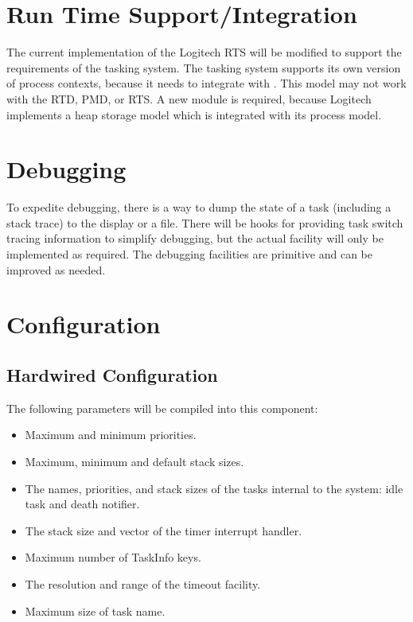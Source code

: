 \section{Run Time Support/Integration}

The current implementation of the Logitech RTS will be
modified to support the requirements of the tasking system.  
The tasking system supports its own version of process contexts,
because it needs to integrate with .
This model may not work with the RTD, PMD, or RTS.  A 
new  module is required, because Logitech implements
a heap storage model which is integrated with its process model.

\section{Debugging}

To expedite debugging, there is a way to dump the state
of a task (including a stack trace) to the display or a file.  
There will be hooks for providing task switch tracing information to
simplify debugging, but the actual facility will only be implemented
as required.  The debugging facilities are primitive and can be improved
as needed.

\section{Configuration}

\subsection{Hardwired Configuration}
The following parameters will be compiled into this component:
\begin{itemize}
\item
    Maximum and minimum priorities.
\item
    Maximum, minimum and default stack sizes.
\item
    The names, priorities, and stack sizes of the tasks internal to the system: 
    idle task and death notifier.
\item
    The stack size and vector of the timer interrupt handler.
\item
    Maximum number of TaskInfo keys.
\item
    The resolution and range of the timeout facility.
\item
    Maximum size of task name.
\end{itemize}

